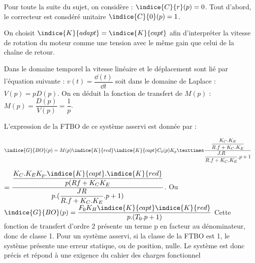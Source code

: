 Pour toute la suite du sujet, on considère : $\indice{C}{r}(p)=0$. Tout d'abord, le correcteur est consdéré unitaire $\indice{C}{0}(p)=1$.
\fi

%
\question{}

\ifprof
\begin{corrige}%
On choisit $\indice{K}{adapt}=\indice{K}{capt}$ afin d’interpréter la vitesse de rotation du moteur comme une tension avec le même gain que celui de la chaîne de retour.

Dans le domaine temporel la vitesse linéaire et le déplacement sont lié par l’équation suivante :
$v(t)=\dfrac{\dd(t)}{\dd t}$ soit dans le domaine de Laplace : $V(p)=pD(p)$.
On en déduit la fonction de transfert de $M(p)$ : $M(p)=\dfrac{D(p)}{V(p)} =\dfrac{1}{p}$.

\end{corrige}
\else
\fi

\ifprof
\begin{corrige}%
L’expression de la FTBO de ce système asservi est donnée par :

$\indice{G}{BO}(p)=M(p)\indice{K}{red}\indice{K}{capt}C_0 (p)K_p×\dfrac{\dfrac{K_C.K_E}{R.f+K_C.K_E}}{\dfrac{J.R}{R.f+K_C.K_E}.p+1}$

$=\dfrac{\dfrac{K_C.K_EK_p.\indice{K}{capt}.\indice{K}{red}}{p(Rf+K_CK_E}}{p.(\dfrac{JR}{R.f+K_C.K_E}.p+1) }$.
Ou $\indice{G}{BO}(p)= \dfrac{F_0 K_H\indice{K}{capt}\indice{K}{red}}{p.(T_0.p+1)}$
Cette fonction de transfert d’ordre 2 présente un terme p en facteur au dénominateur, donc de classe 1.
Pour un système asservi, si la classe de la FTBO est 1, le système présente une erreur statique, ou de position, nulle. Le système est donc précis et répond à une exigence du cahier des charges fonctionnel

\end{corrige}
\else
\fi
 
